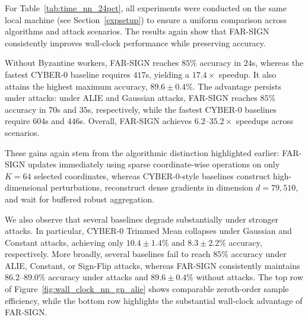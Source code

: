 \documentclass{article}
\newcommand{\farsign}{FAR-SIGN\xspace}
\begin{document}
For Table~\ref{tab:time_nn_24pct}, all experiments were conducted on the same local machine (see Section~\ref{expsetup}) to ensure a uniform comparison across algorithms and attack scenarios. The results again show that \farsign{} consistently improves wall-clock performance while preserving accuracy. 

Without Byzantine workers, \farsign{} reaches $85\%$ accuracy in $24$s, whereas the fastest CYBER-0 baseline requires $417$s, yielding a $17.4\times$ speedup. It also attains the highest maximum accuracy, $89.6\pm0.4\%$. The advantage persists under attacks: under ALIE and Gaussian attacks, \farsign{} reaches $85\%$ accuracy in $70$s and $35$s, respectively, while the fastest CYBER-0 baselines require $604$s and $446$s. Overall, \farsign{} achieves $6.2$--$35.2\times$ speedups across scenarios. 

These gains again stem from the algorithmic distinction highlighted earlier: \farsign{} updates immediately using sparse coordinate-wise operations on only $K=64$ selected coordinates, whereas CYBER-0-style baselines construct high-dimensional perturbations, reconstruct dense gradients in dimension $d=79{,}510$, and wait for buffered robust aggregation. 

We also observe that several baselines degrade substantially under stronger attacks. In particular, CYBER-0 Trimmed Mean collapses under Gaussian and Constant attacks, achieving only $10.4\pm1.4\%$ and $8.3\pm2.2\%$ accuracy, respectively. More broadly, several baselines fail to reach $85\%$ accuracy under ALIE, Constant, or Sign-Flip attacks, whereas \farsign{} consistently maintains $86.2$--$89.0\%$ accuracy under attacks and $89.6\pm0.4\%$ without attacks. The top row of Figure~\ref{fig:wall_clock_nn_gn_alie} shows comparable zeroth-order sample efficiency, while the bottom row highlights the substantial wall-clock advantage of \farsign{}.



\end{document}
